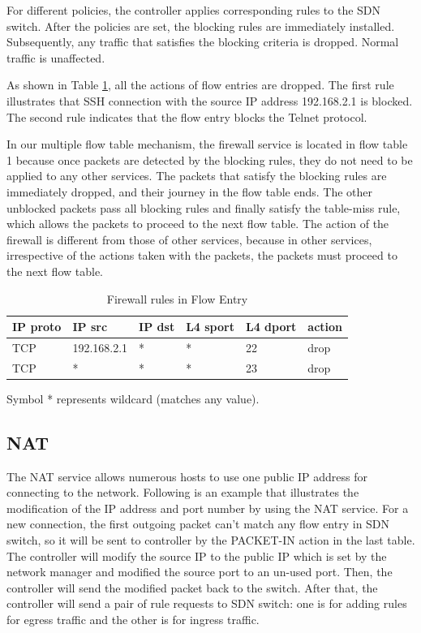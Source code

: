 For different policies, the controller applies corresponding rules to the SDN switch. After the policies are set, the blocking rules are immediately installed. Subsequently, any traffic that satisfies the blocking criteria is dropped. Normal traffic is unaffected.

As shown in Table \ref{table:fw}, all the actions of flow entries are dropped. The first rule illustrates that SSH connection with the source IP address 192.168.2.1 is blocked. The second rule indicates that the flow entry blocks the Telnet protocol.

In our multiple flow table mechanism, the firewall service is located in flow table 1 because once packets are detected by the blocking rules, they do not need to be applied to any other services. The packets that satisfy the blocking rules are immediately dropped, and their journey in the flow table ends. The other unblocked packets pass all blocking rules and finally satisfy the table-miss rule, which allows the packets to proceed to the next flow table. The action of the firewall is different from those of other services, because in other services, irrespective of the actions taken with the packets, the packets must proceed to the next flow table.

\begin{table}[!t]
\caption{Firewall rules in Flow Entry}
\label{table:fw}
\centering
\begin{threeparttable}
\begin{tabular}{|l|l|l|l|l|l|}
\hline
IP proto & IP src      & IP dst       & L4 sport & L4 dport & action \\ \hline
TCP      & 192.168.2.1 & *            & *        & 22       & drop   \\ \hline
TCP      & *           & *            & *        & 23       & drop   \\ \hline
\end{tabular}
  \begin{tablenotes}
    \item[] Symbol * represents wildcard (matches any value).
  \end{tablenotes}
\end{threeparttable}
\end{table}


\subsection{NAT}
The NAT service allows numerous hosts to use one public IP address for connecting to the network. Following is an example that illustrates the modification of the IP address and port number by using the NAT service. For a new connection, the first outgoing packet can’t match any flow entry in SDN switch, so it will be sent to controller by the PACKET-IN action in the last table. The controller will modify the source IP to the public IP which is set by the network manager and modified the source port to an un-used port. Then, the controller will send the modified packet back to the switch. After that, the controller will send a pair of rule requests to SDN switch: one is for adding rules for egress traffic and the other is for ingress traffic.

